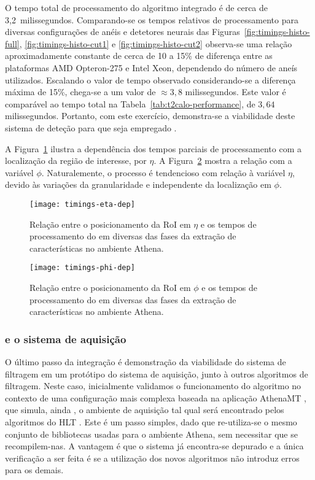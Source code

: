 O tempo total de processamento do algoritmo integrado é de cerca de
3,2~milissegundos. Comparando-se os tempos relativos de processamento para
diversas configurações de anéis e detetores neurais das
Figuras~\ref{fig:timings-histo-full}, \ref{fig:timings-histo-cut1} e
\ref{fig:timings-histo-cut2} observa-se uma relação aproximadamente constante
de cerca de 10 a 15\% de diferença entre as plataformas AMD Opteron-275 e
Intel Xeon, dependendo do número de aneís utilizados. Escalando o valor de
tempo observado considerando-se a diferença máxima de 15\%, chega-se a um
valor de $\approx 3,8$ milissegundos. Este valor é comparável ao tempo total
na Tabela~\ref{tab:t2calo-performance}, de $3,64$ milissegundos. Portanto, com
este exercício, demonstra-se a viabilidade deste sistema de deteção para que
seja empregado .

A Figura~\ref{fig:timings-eta-dep} ilustra a dependência dos tempos parciais
de processamento com a localização da região de interesse, por $\eta$. A
Figura~\ref{fig:timings-phi-dep} mostra a relação com a variável
$\phi$. Naturalemente, o processo é tendencioso com relação à variável $\eta$,
devido às variações da granularidade e independente da localização em $\phi$.

\begin{figure}
\begin{center}
\texttt{[image: timings-eta-dep]}
\end{center}
\caption{Relação entre o posicionamento da RoI em $\eta$ e os tempos de
processamento do  em diversas das fases da extração de
características no ambiente Athena.}
\label{fig:timings-eta-dep}
\end{figure}

\begin{figure}
\begin{center}
\texttt{[image: timings-phi-dep]}
\end{center}
\caption{Relação entre o posicionamento da RoI em $\phi$ e os tempos de
processamento do  em diversas das fases da extração de
características no ambiente Athena.}
\label{fig:timings-phi-dep}
\end{figure}

\subsubsection{ e o sistema de aquisição}

O último passo da integração é demonstração da viabilidade do sistema de
filtragem em um protótipo do sistema de aquisição, junto à outros algoritmos
de filtragem. Neste caso, inicialmente validamos o funcionamento do algoritmo
no contexto de uma configuração mais complexa baseada na aplicação AthenaMT
\cite{aa:tns-2004-2}, que simula, ainda , o ambiente de aquisição
tal qual será encontrado pelos algoritmos do HLT . Este é um passo
simples, dado que re-utiliza-se o mesmo conjunto de bibliotecas usadas para o
ambiente Athena, sem necessitar que se recompilem-nas. A vantagem é que o
sistema já encontra-se depurado e a única verificação a ser feita é se a
utilização dos novos algoritmos não introduz erros para os demais.


